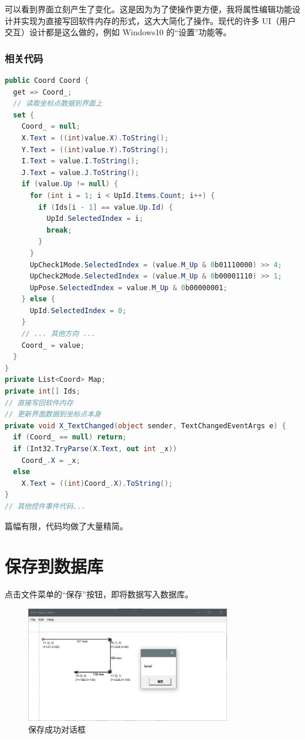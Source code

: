 可以看到界面立刻产生了变化。这是因为为了使操作更方便，我将属性编辑功能设计并实现为直接写回软件内存的形式，这大大简化了操作。现代的许多 UI（用户交互）设计都是这么做的，例如 Windows10 的``设置''功能等。

\subsubsection{相关代码}

\begin{lstlisting}[language=cs]
public Coord Coord {
  get => Coord_;
  // 读取坐标点数据到界面上
  set {
    Coord_ = null;
    X.Text = ((int)value.X).ToString();
    Y.Text = ((int)value.Y).ToString();
    I.Text = value.I.ToString();
    J.Text = value.J.ToString();
    if (value.Up != null) {
      for (int i = 1; i < UpId.Items.Count; i++) {
        if (Ids[i - 1] == value.Up.Id) {
          UpId.SelectedIndex = i;
          break;
        }
      }
      UpCheck1Mode.SelectedIndex = (value.M_Up & 0b01110000) >> 4;
      UpCheck2Mode.SelectedIndex = (value.M_Up & 0b00001110) >> 1;
      UpPose.SelectedIndex = value.M_Up & 0b00000001;
    } else {
      UpId.SelectedIndex = 0;
    }
    // ... 其他方向 ...
    Coord_ = value;
  }
}
private List<Coord> Map;
private int[] Ids;
// 直接写回软件内存
// 更新界面数据到坐标点本身
private void X_TextChanged(object sender, TextChangedEventArgs e) {
  if (Coord_ == null) return;
  if (Int32.TryParse(X.Text, out int _x))
    Coord_.X = _x;
  else
    X.Text = ((int)Coord_.X).ToString();
}
// 其他控件事件代码...
\end{lstlisting}

篇幅有限，代码均做了大量精简。

\section{保存到数据库}

点击文件菜单的``保存''按钮，即将数据写入数据库。

\begin{figure}[H]
  \centering
  \includegraphics[width=0.8\textwidth]{assets/save.png}
  \caption{保存成功对话框}
  \label{fig:save}
\end{figure}

